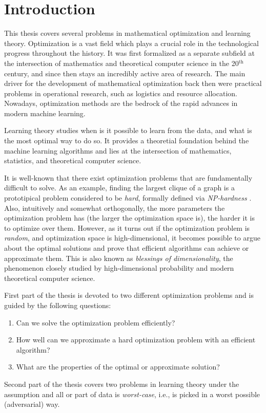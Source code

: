 \chapter{Introduction}
\label{ch:introduction}

This thesis covers several problems in mathematical optimization and learning theory.
Optimization is a vast field which plays a crucial role in the technological progress throughout the history.
It was first formalized as a separate subfield at the intersection of mathematics and theoretical computer science in the 20\(^\text{th}\) century, and since then stays an incredibly active area of research.
The main driver for the development of mathematical optimization back then were practical problems in operational research, such as logistics and resource allocation.
Nowadays, optimization methods are the bedrock of the rapid advances in modern machine learning. 

Learning theory studies when is it possible to learn from the data, and what is the most optimal way to do so.
It provides a theoretial foundation behind the machine learning algorithms and lies at the intersection of mathematics, statistics, and theoretical computer science.

It is well-known that there exist optimization problems that are fundamentally difficult to solve.
As an example, finding the largest clique of a graph is a prototipical problem considered to be \emph{hard}, formally defined via \emph{NP-hardness} .
Also, intuitively and somewhat orthogonally, the more parameters the optimization problem has (the larger the optimization space is), the harder it is to optimize over them.
However, as it turns out if the optimization problem is \textit{random}, 
and optimization space is high-dimensional, it becomes possible to argue about the optimal solutions and prove that efficient algorithms can achieve or approximate them.
This is also known as \emph{blessings of dimensionality}, the phenomenon closely studied by high-dimensional probability and modern theoretical computer science.

First part of the thesis is devoted to two different optimization problems and is guided by the following questions:
\begin{enumerate}
  \item Can we solve the optimization problem efficiently?
  \item How well can we approximate a hard optimization problem with an efficient algorithm?
  \item What are the properties of the optimal or approximate solution?
\end{enumerate}
\noindent
Second part of the thesis covers two problems in learning theory under the assumption and all or part of data is \emph{worst-case}, i.e., 
is picked in a worst possible (adversarial) way.

